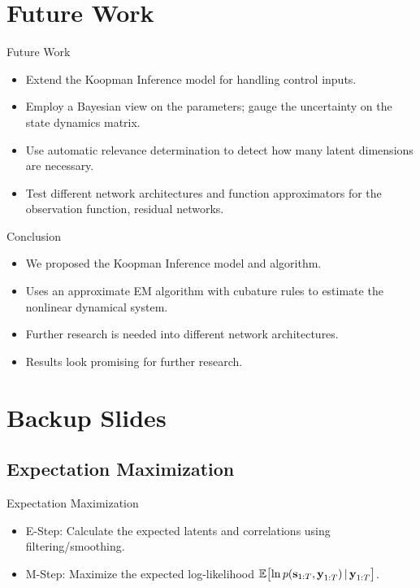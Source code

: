 \documentclass[
	aspectratio=43,
	color={accentcolor=1c},
	logo=false,
	colorframetitle=true,
]{tudabeamer}
\begin{document}
	\section{Future Work}
		\begin{frame}{Future Work}
			\begin{itemize}
				\item Extend the Koopman Inference model for handling control inputs.
				\item Employ a Bayesian view on the parameters; gauge the uncertainty on \eg the state dynamics matrix.
				\item Use automatic relevance determination to detect how many latent dimensions are necessary.
				\item Test different network architectures and function approximators for the observation function, \eg residual networks.
			\end{itemize}
		\end{frame}

		\begin{frame}{Conclusion}
			\begin{itemize}
				\item We proposed the Koopman Inference model and algorithm.
				\item Uses an approximate EM algorithm with cubature rules to estimate the nonlinear dynamical system.
				\item Further research is needed into \eg different network architectures.
				\item Results look promising for further research.
			\end{itemize}
		\end{frame}





	\appendix

	\section{Backup Slides} \sectionslide
		\subsection{Expectation Maximization}
			\begin{frame}{Expectation Maximization}
				\begin{itemize}
					\item E-Step: Calculate the expected latents and correlations using filtering/smoothing.
					\item M-Step: Maximize the expected log-likelihood \( \mathbb{E}\big[\! \ln p(\boldsymbol{\mathrm{s}}_{1:T}, \boldsymbol{\mathrm{y}}_{1:T}) \,\vert\, \boldsymbol{\mathrm{y}}_{1:T} \big] \).
				\end{itemize}
			\end{frame}
\end{document}
